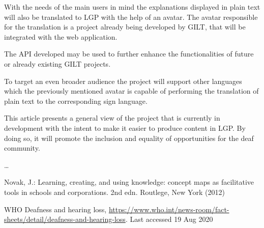 \documentclass[runningheads]{llncs}
\begin{document}
With the needs of the main users in mind the explanations displayed in plain text will also be translated to LGP with the help of an avatar.
The avatar responsible for the translation is a project already being developed by GILT, that will be integrated with the web application.

The API developed may be used to further enhance the functionalities of future or already existing GILT projects.

To target an even broader audience the project will support other languages which the previously mentioned avatar is capable of performing the translation of plain text to the corresponding sign language.

This article presents a general view of the project that is currently in development with the intent to make it easier to produce content in LGP.
By doing so, it will promote the inclusion and equality of opportunities for the deaf community.

\dots

%
%
%
% 
% 
%
\begin{thebibliography}{8}
Novak, J.: Learning, creating, and using knowledge: concept maps as facilitative tools in schools and corporations. 2nd edn. Routlege, New York (2012)

WHO Deafness and hearing loss, \url{https://www.who.int/news-room/fact-sheets/detail/deafness-and-hearing-loss}. Last accessed 19 Aug 2020





\end{thebibliography}
\end{document}
